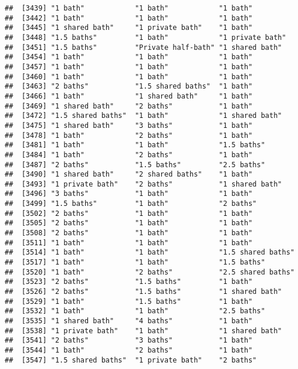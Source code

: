\documentclass[
]{article}
\begin{document}
\begin{verbatim}
##  [3439] "1 bath"            "1 bath"            "1 bath"           
##  [3442] "1 bath"            "1 bath"            "1 bath"           
##  [3445] "1 shared bath"     "1 private bath"    "1 bath"           
##  [3448] "1.5 baths"         "1 bath"            "1 private bath"   
##  [3451] "1.5 baths"         "Private half-bath" "1 shared bath"    
##  [3454] "1 bath"            "1 bath"            "1 bath"           
##  [3457] "1 bath"            "1 bath"            "1 bath"           
##  [3460] "1 bath"            "1 bath"            "1 bath"           
##  [3463] "2 baths"           "1.5 shared baths"  "1 bath"           
##  [3466] "1 bath"            "1 shared bath"     "1 bath"           
##  [3469] "1 shared bath"     "2 baths"           "1 bath"           
##  [3472] "1.5 shared baths"  "1 bath"            "1 shared bath"    
##  [3475] "1 shared bath"     "3 baths"           "1 bath"           
##  [3478] "1 bath"            "2 baths"           "1 bath"           
##  [3481] "1 bath"            "1 bath"            "1.5 baths"        
##  [3484] "1 bath"            "2 baths"           "1 bath"           
##  [3487] "2 baths"           "1.5 baths"         "2.5 baths"        
##  [3490] "1 shared bath"     "2 shared baths"    "1 bath"           
##  [3493] "1 private bath"    "2 baths"           "1 shared bath"    
##  [3496] "3 baths"           "1 bath"            "1 bath"           
##  [3499] "1.5 baths"         "1 bath"            "2 baths"          
##  [3502] "2 baths"           "1 bath"            "1 bath"           
##  [3505] "2 baths"           "1 bath"            "1 bath"           
##  [3508] "2 baths"           "1 bath"            "1 bath"           
##  [3511] "1 bath"            "1 bath"            "1 bath"           
##  [3514] "1 bath"            "1 bath"            "1.5 shared baths" 
##  [3517] "1 bath"            "1 bath"            "1.5 baths"        
##  [3520] "1 bath"            "2 baths"           "2.5 shared baths" 
##  [3523] "2 baths"           "1.5 baths"         "1 bath"           
##  [3526] "2 baths"           "1.5 baths"         "1 shared bath"    
##  [3529] "1 bath"            "1.5 baths"         "1 bath"           
##  [3532] "1 bath"            "1 bath"            "2.5 baths"        
##  [3535] "1 shared bath"     "4 baths"           "1 bath"           
##  [3538] "1 private bath"    "1 bath"            "1 shared bath"    
##  [3541] "2 baths"           "3 baths"           "1 bath"           
##  [3544] "1 bath"            "2 baths"           "1 bath"           
##  [3547] "1.5 shared baths"  "1 private bath"    "2 baths"          

\end{verbatim}
\end{document}
